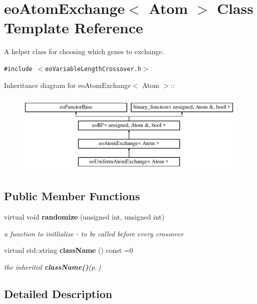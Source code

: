\section{eo\-Atom\-Exchange$<$ Atom $>$ Class Template Reference}
\label{classeo_atom_exchange}
A helper class for choosing which genes to exchange.  


{\tt \#include $<$eo\-Variable\-Length\-Crossover.h$>$}

Inheritance diagram for eo\-Atom\-Exchange$<$ Atom $>$::\begin{figure}[H]
\begin{center}
\leavevmode
\includegraphics[height=4cm]{classeo_atom_exchange}
\end{center}
\end{figure}
\subsection*{Public Member Functions}
\begin{CompactItemize}
\item 
virtual void {\bf randomize} (unsigned int, unsigned int)\label{classeo_atom_exchange_a0}

\begin{CompactList}\small\item\em a function to initlialize - to be called before every crossover \item\end{CompactList}\item 
virtual std::string {\bf class\-Name} () const =0\label{classeo_atom_exchange_a1}

\begin{CompactList}\small\item\em the inherited {\bf class\-Name()}{\rm (p.\,\pageref{classeo_atom_exchange_a1})} \item\end{CompactList}\end{CompactItemize}


\subsection{Detailed Description}
